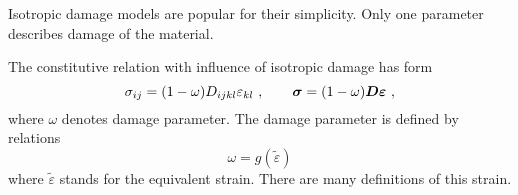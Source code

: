 Isotropic damage models are popular for their simplicity. Only one parameter
describes damage of the material.

The constitutive relation with influence of isotropic damage has form
\begin{equation}
\sigma_{ij} = (1-\omega) D_{ijkl} \varepsilon_{kl}\ ,\ \ \ \ \ \
\mbox{\boldmath$\sigma$} = (1-\omega) \mbox{\boldmath$D$} \mbox{\boldmath$\varepsilon$}\ ,
\end{equation}
where $\omega$ denotes damage  parameter. The damage parameter is defined
by relations
\begin{equation}
\omega = g (\tilde{\varepsilon})
\end{equation}
where $\tilde{\varepsilon}$ stands for the equivalent  strain. There are many definitions
of this strain.

